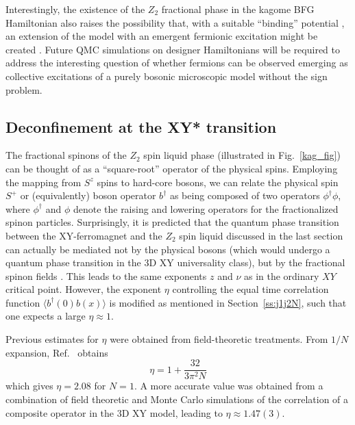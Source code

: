\documentclass[range]{ar2e}
\begin{document}
Interestingly, the existence of the $Z_2$ fractional phase in the kagome BFG Hamiltonian also raises the possibility that, with a suitable ``binding'' potential \cite{FermionBind}, an extension of the model with an emergent fermionic excitation might be created \cite{Wenbook}.  
Future QMC simulations on designer Hamiltonians will be required to address the interesting question of whether fermions can be observed emerging as collective excitations of a purely bosonic microscopic model without the sign problem.

\subsection{Deconfinement at the XY* transition} \label{XYstar}

The fractional spinons of the $Z_2$ spin liquid phase (illustrated in Fig.~\ref{kag_fig}) can be thought of as a ``square-root'' operator of the physical spins.  Employing the mapping from $S^z$ spins to hard-core bosons, we can relate the physical spin $S^+$ or (equivalently) boson operator $b^{\dagger}$ as being composed of two operators  $\phi^\dagger \phi$, where $\phi^\dagger$ and $\phi$ denote the raising and lowering operators for the fractionalized spinon particles.  
Surprisingly, it is predicted that the quantum phase transition between the XY-ferromagnet and the $Z_2$ spin liquid discussed in the last section can actually be mediated not by the physical bosons (which would undergo a quantum phase transition in the 3D XY universality class), but by the fractional spinon fields \cite{XYstar1,XYstar2,earlyXYstar}.  This leads to the same exponents $z$ and $\nu$ as in the ordinary $XY$ critical point.  However, the exponent $\eta$ controlling the equal time correlation function $\langle b^\dagger(0) b(x) \rangle$ is modified as mentioned in Section~\ref{ss:j1j2N}, such that one expects a large $\eta \approx 1$.

Previous estimates for $\eta$ were obtained from field-theoretic treatments.  From $1/N$ expansion, Ref.~\cite{XYstar2} obtains
\begin{equation}
\eta = 1 + \frac{32}{3 \pi^2 N}
\end{equation}
which gives $\eta = 2.08$ for $N=1$.
A more accurate value was obtained from a combination of field theoretic and Monte Carlo simulations of the correlation of a composite operator in the 3D XY model\cite{compositefieldtheory,compositeMC}, leading to $\eta\approx  1.47(3)$.
\end{document}
